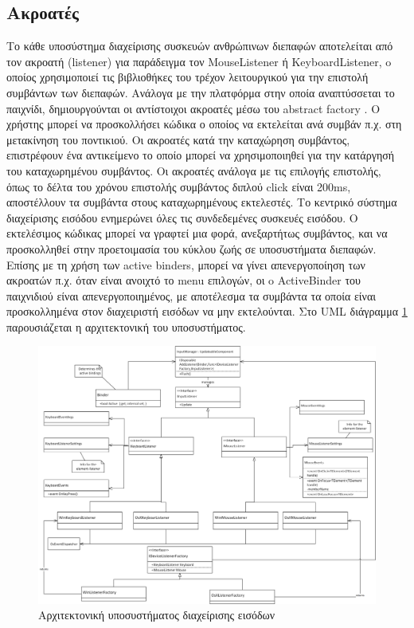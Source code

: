 	\subsection{Ακροατές}
	Το κάθε υποσύστημα διαχείρισης συσκευών ανθρώπινων διεπαφών αποτελείται από τον ακροατή (listener) για παράδειγμα τον MouseListener ή KeyboardListener, o οποίος χρησιμοποιεί τις βιβλιοθήκες του τρέχον λειτουργικού για την επιστολή συμβάντων των διεπαφών. Ανάλογα με την πλατφόρμα στην οποία αναπτύσσεται το παιχνίδι, δημιουργούνται οι αντίστοιχοι ακροατές μέσω του abstract factory \cite{Gamma:1995:DPE:186897}.
	Ο χρήστης μπορεί να προσκολλήσει κώδικα ο οποίος να εκτελείται ανά συμβάν π.χ. στη μετακίνηση του ποντικιού. Οι ακροατές κατά την καταχώρηση συμβάντος, επιστρέφουν ένα αντικείμενο το οποίο μπορεί να χρησιμοποιηθεί για την κατάργησή του καταχωρημένου συμβάντος. Οι ακροατές ανάλογα με τις επιλογής επιστολής, όπως το δέλτα του χρόνου επιστολής συμβάντος διπλού click είναι 200ms, αποστέλλουν τα συμβάντα στους καταχωρημένους εκτελεστές. Το κεντρικό σύστημα διαχείρισης εισόδου ενημερώνει όλες τις συνδεδεμένες συσκευές εισόδου. 
	Ο εκτελέσιμος κώδικας μπορεί να γραφτεί μια φορά, ανεξαρτήτως συμβάντος, και να προσκολληθεί στην προετοιμασία του κύκλου ζωής σε υποσυστήματα διεπαφών. Επίσης με τη χρήση των active binders, μπορεί να γίνει απενεργοποίηση των ακροατών π.χ. όταν είναι ανοιχτό το menu επιλογών, οι o ActiveBinder του παιχνιδιού είναι απενεργοποιημένος, με αποτέλεσμα τα συμβάντα τα οποία είναι προσκολλημένα στον διαχειριστή εισόδων να μην εκτελούνται. Στο \gls{UML} διάγραμμα \ref{fig:core_input} παρουσιάζεται η αρχιτεκτονική του υποσυστήματος.
	
	
	\begin{figure}[h!]
		\centering
		\includegraphics[width=165mm]{Images/core_input}
		\caption{Αρχιτεκτονική υποσυστήματος διαχείρισης εισόδων}
		\label{fig:core_input}
	\end{figure}
		
